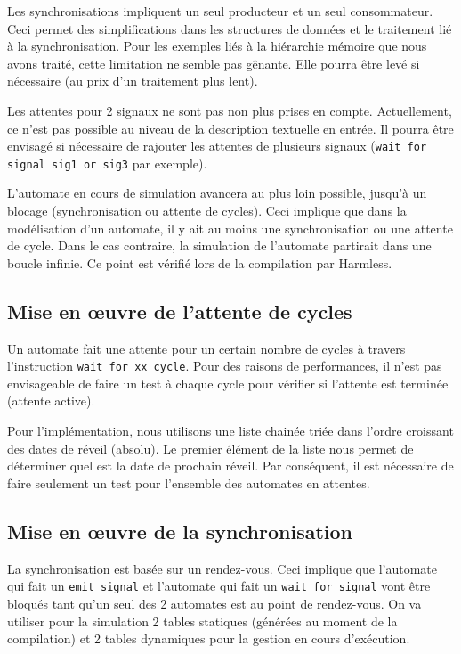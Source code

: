 \documentclass[11pt,a4paper]{article}
\begin{document}
Les synchronisations impliquent un seul producteur et un seul consommateur. Ceci permet des simplifications dans les structures de données et le traitement lié à la synchronisation. Pour les exemples liés à la hiérarchie mémoire que nous avons traité, cette limitation ne semble pas gênante. Elle pourra être levé si nécessaire (au prix d'un traitement plus lent).

Les attentes pour 2 signaux ne sont pas non plus prises en compte. Actuellement, ce n'est pas possible au niveau de la description textuelle en entrée. Il pourra être envisagé si nécessaire de rajouter les attentes de plusieurs signaux (\texttt{wait for signal sig1 or sig3} par exemple).

L'automate en cours de simulation avancera au plus loin possible, jusqu'à un blocage (synchronisation ou attente de cycles). Ceci implique que dans la modélisation d'un automate, il y ait au moins une synchronisation ou une attente de cycle. Dans le cas contraire, la simulation de l'automate partirait dans une boucle infinie. Ce point est vérifié lors de la compilation par Harmless.

\subsection{Mise en œuvre de l'attente de cycles}
Un automate fait une attente pour un certain nombre de cycles à travers l'instruction \texttt{wait for xx cycle}. Pour des raisons de performances, il n'est pas envisageable de faire un test à chaque cycle pour vérifier si l'attente est terminée (attente active).

Pour l'implémentation, nous utilisons une liste chainée triée dans l'ordre croissant des dates de réveil (absolu). Le premier élément de la liste nous permet de déterminer quel est la date de prochain réveil. Par conséquent, il est nécessaire de faire seulement un test pour l'ensemble des automates en attentes. 

\subsection{Mise en œuvre de la synchronisation}
La synchronisation est basée sur un rendez-vous. Ceci implique que l'automate qui fait un \texttt{emit signal} et l'automate qui fait un \texttt{wait for signal} vont être bloqués tant qu'un seul des 2 automates est au point de rendez-vous. On va utiliser pour la simulation 2 tables statiques (générées au moment de la compilation) et 2 tables dynamiques pour la gestion en cours d'exécution. 
\end{document}

